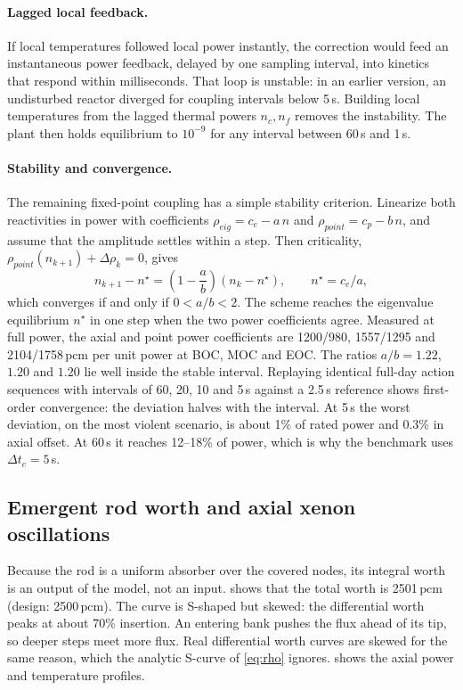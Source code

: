 \documentclass[11pt,a4paper]{article}
\newcommand{\pcm}{\ensuremath{\,\mathrm{pcm}}}
\begin{document}
\paragraph{Lagged local feedback.} If local temperatures followed local power
instantly, the correction would feed an instantaneous power feedback, delayed by one
sampling interval, into kinetics that respond within milliseconds. That loop is
unstable: in an earlier version, an undisturbed reactor diverged for coupling intervals
below 5\,s. Building local temperatures from the lagged thermal powers $n_c, n_f$
removes the instability. The plant then holds equilibrium to $10^{-9}$ for any
interval between 60\,s and 1\,s.

\paragraph{Stability and convergence.} The remaining fixed-point coupling has a simple
stability criterion. Linearize both reactivities in power with coefficients
$\rho_{eig} = c_e - a\,n$ and $\rho_{point} = c_p - b\,n$, and assume that the
amplitude settles within a step. Then criticality, $\rho_{point}(n_{k+1}) + \Delta\rho_k = 0$, gives
\begin{equation}
  n_{k+1} - n^\star = \left(1 - \frac{a}{b}\right)(n_k - n^\star), \qquad n^\star = c_e/a,
  \label{eq:coupling}
\end{equation}
which converges if and only if $0 < a/b < 2$. The scheme reaches the eigenvalue
equilibrium $n^\star$ in one step when the two power coefficients agree. Measured at
full power, the axial and point power coefficients are
1200/980, 1557/1295 and 2104/1758\pcm{}
per unit power at BOC, MOC and EOC. The ratios $a/b = 1.22$, $1.20$ and
$1.20$ lie well inside the stable interval. Replaying identical full-day action
sequences with intervals of 60, 20, 10 and 5\,s against a 2.5\,s reference shows
first-order convergence: the deviation halves with the interval. At 5\,s the worst
deviation, on the most violent scenario, is about 1\% of rated power and 0.3\% in axial
offset. At 60\,s it reaches 12--18\% of power, which is why the benchmark uses
$\Delta t_c = 5$\,s.

\subsection{Emergent rod worth and axial xenon oscillations}

Because the rod is a uniform absorber over the covered nodes, its integral worth is an
output of the model, not an input.  shows that the total worth is
2501\pcm{} (design: 2500\pcm). The curve is S-shaped but skewed: the
differential worth peaks at about 70\% insertion. An entering bank pushes the flux
ahead of its tip, so deeper steps meet more flux. Real differential worth curves are
skewed for the same reason, which the analytic S-curve of \cref{eq:rho} ignores.
 shows the axial power and temperature profiles.
\end{document}
